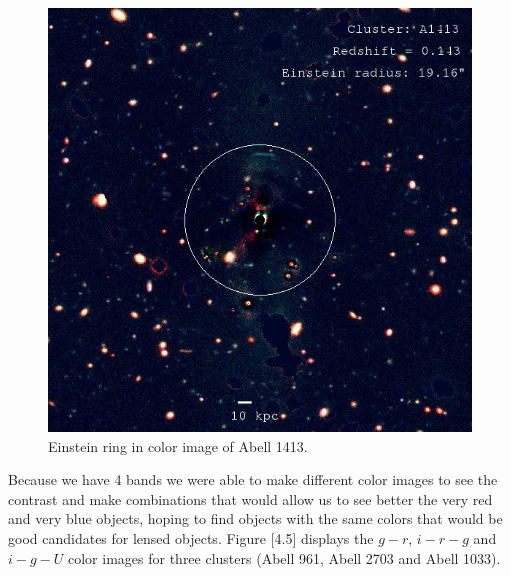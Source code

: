 \begin{figure}[H]
\centering
\includegraphics[width=15cm]{images/A1413_ring.jpg}
\caption[Einstein ring in color image of A1413]{Einstein ring in color image of Abell 1413.}
\end{figure}

Because we have 4 bands we were able to make different color images to see the contrast and make combinations that would allow us to see better the very red and very blue objects, hoping to find objects with the same colors that would be good candidates for lensed objects. Figure [4.5] displays the $g-r$, $i-r-g$ and $i-g-U$ color images for three clusters (Abell 961, Abell 2703 and Abell 1033). 


